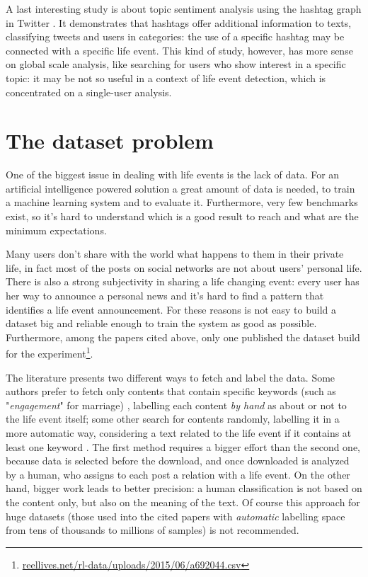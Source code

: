 A last interesting study is about topic sentiment analysis using the hashtag graph in Twitter \cite{wang2011topic}. It demonstrates that hashtags offer additional information to texts, classifying tweets and users in categories: the use of a specific hashtag may be connected with a specific life event. This kind of study, however, has more sense on global scale analysis, like searching for users who show interest in a specific topic: it may be not so useful in a context of life event detection, which is concentrated on a single-user analysis.


\section{The dataset problem}
\label{sec:dataset}
One of the biggest issue in dealing with life events is the lack of data. For an artificial intelligence powered solution a great amount of data is needed, to train a machine learning system and to evaluate it. Furthermore, very few benchmarks exist, so it's hard to understand which is a good result to reach and what are the minimum expectations.

Many users don't share with the world what happens to them in their private life, in fact most of the posts on social networks are not about users' personal life. There is also a strong subjectivity in sharing a life changing event: every user has her way to announce a personal news and it's hard to find a pattern that identifies a life event announcement. For these reasons is not easy to build a dataset big and reliable enough to train the system as good as possible. Furthermore, among the papers cited above, only one \cite{dickinson2015identifying} published the dataset build for the experiment\footnote{\url{reellives.net/rl-data/uploads/2015/06/a692044.csv}}.

The literature presents two different ways to fetch and label the data. Some authors prefer to fetch only contents that contain specific keywords (such as "\emph{engagement}" for marriage) \cite{dickinson2015identifying, khobarekar2013detecting}, labelling each content \emph{by hand} as about or not to the life event itself; some other search for contents randomly, labelling it in a more automatic way, considering a text related to the life event if it contains at least one keyword \cite{choudhury2014personal, di2013detecting, moyanolife}. The first method requires a bigger effort than the second one, because data is selected before the download, and once downloaded is analyzed by a human, who assigns to each post a relation with a life event. On the other hand, bigger work leads to better precision: a human classification is not based on the content only, but also on the meaning of the text. Of course this approach for huge datasets (those used into the cited papers with \emph{automatic} labelling space from tens of thousands to millions of samples) is not recommended. 

